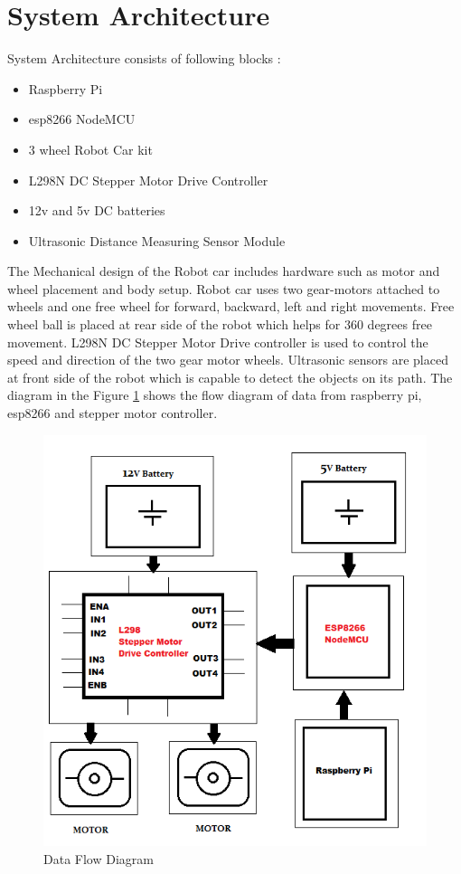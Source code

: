 \documentclass[sigconf]{acmart}
\begin{document}
\section{System Architecture}
System Architecture consists of following blocks :

\begin{itemize}
\item Raspberry Pi
\item esp8266 NodeMCU
\item 3 wheel Robot Car kit
\item L298N DC Stepper Motor Drive Controller
\item 12v and 5v DC batteries
\item Ultrasonic Distance Measuring Sensor Module 
\end{itemize}

The Mechanical design of the Robot car includes hardware such as motor and wheel placement and body setup. Robot car uses two gear-motors attached to wheels and one free wheel for forward, backward, left and right movements. Free wheel ball is placed at rear side of the robot which helps for 360 degrees free movement. L298N DC Stepper Motor Drive controller is used to control the speed and direction of the two gear motor wheels. Ultrasonic sensors are placed at front side of the robot which is capable to detect the objects on its path. The diagram in the Figure \ref{F:flow} shows the flow diagram of data from raspberry pi, esp8266 and stepper motor controller.

\begin{figure}[htb]
      \includegraphics[width=\columnwidth]{images/FlowDiagram.png}
      \caption{Data Flow Diagram}\label{F:flow}
\end{figure}
\end{document}
